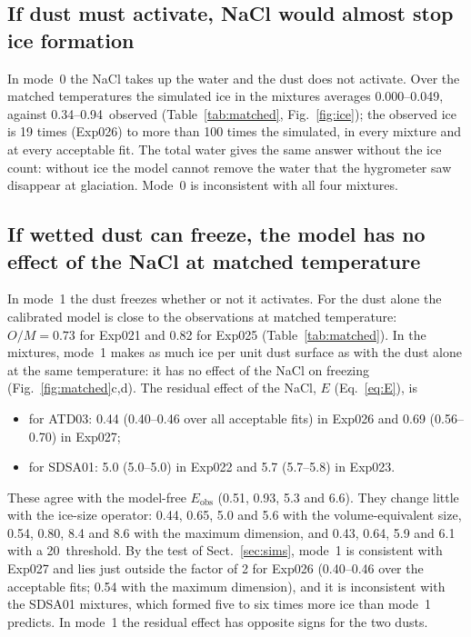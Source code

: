 \subsection{If dust must activate, NaCl would almost stop ice formation}\label{sec:test-m0}

In mode~0 the NaCl takes up the water and the dust does not activate. Over the matched temperatures the simulated ice in the mixtures averages 0.000--0.049\cmc, against 0.34--0.94\cmc\ observed (Table~\ref{tab:matched}, Fig.~\ref{fig:ice}); the observed ice is 19 times (Exp026) to more than 100 times the simulated, in every mixture and at every acceptable fit. The total water gives the same answer without the ice count: without ice the model cannot remove the water that the hygrometer saw disappear at glaciation. Mode~0 is inconsistent with all four mixtures.

\subsection{If wetted dust can freeze, the model has no effect of the NaCl at matched temperature}\label{sec:test-m1}\label{sec:matched}

In mode~1 the dust freezes whether or not it activates. For the dust alone the calibrated model is close to the observations at matched temperature: $O/M = 0.73$ for Exp021 and 0.82 for Exp025 (Table~\ref{tab:matched}). In the mixtures, mode~1 makes as much ice per unit dust surface as with the dust alone at the same temperature: it has no effect of the NaCl on freezing (Fig.~\ref{fig:matched}c,d). The residual effect of the NaCl, $E$ (Eq.~\ref{eq:E}), is
\begin{itemize}
\item for ATD03: 0.44 (0.40--0.46 over all acceptable fits) in Exp026 and 0.69 (0.56--0.70) in Exp027;
\item for SDSA01: 5.0 (5.0--5.0) in Exp022 and 5.7 (5.7--5.8) in Exp023.
\end{itemize}
These agree with the model-free $E_\mathrm{obs}$ (0.51, 0.93, 5.3 and 6.6). They change little with the ice-size operator: 0.44, 0.65, 5.0 and 5.6 with the volume-equivalent size, 0.54, 0.80, 8.4 and 8.6 with the maximum dimension, and 0.43, 0.64, 5.9 and 6.1 with a 20\um\ threshold. By the test of Sect.~\ref{sec:sims}, mode~1 is consistent with Exp027 and lies just outside the factor of 2 for Exp026 (0.40--0.46 over the acceptable fits; 0.54 with the maximum dimension), and it is inconsistent with the SDSA01 mixtures, which formed five to six times more ice than mode~1 predicts. In mode~1 the residual effect has opposite signs for the two dusts.

